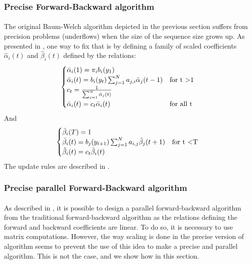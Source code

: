 \subsubsection*{Precise Forward-Backward algorithm}
\paragraph{}
The original Baum-Welch algorithm depicted in the previous section suffers from precision problems (underflows) when the size of the sequence size grows up. As presented in \cite{rabiner1989tutorial}, one way to fix that is by defining a family of scaled coefficients $\hat{\alpha}_i(t)$ and $\hat{\beta}_i(t)$ defined by the relations:
\begin{equation}
\begin{cases}
\bar{\alpha}_i(1) = \pi_i b_i(y_1) & \\
\bar{\alpha}_i(t) = b_i(y_t)\sum_{j=1}^{N}{a_{j,i}\bar{\alpha}_j(t-1)} & \text{for t \textgreater 1} \\
c_t = \frac{1}{\sum^N_{j=1} \bar{\alpha}_j(t)} & \\
\hat{\alpha}_i(t) = c_t \bar{\alpha}_i(t) & \text{for all t}
\end{cases}
\end{equation}
And
\begin{equation}
\begin{cases}
\bar{\beta}_i(T) = 1 & \\
\bar{\beta}_i(t) = b_j(y_{t+1})\sum_{j=1}^{N}{a_{i,j}\hat{\beta}_j(t+1)} & \text{for t \textless T} \\
\hat{\beta}_i(t) = c_t \bar{\beta}_i(t)
\end{cases}
\end{equation}
The update rules are described in \cite{rabiner1989tutorial}.

\subsubsection*{Precise parallel Forward-Backward algorithm}
\paragraph{}
As described in \cite{turin1998unidirectional}, it is possible to design a parallel forward-backward algorithm from the traditional forward-backward algorithm as the relations defining the forward and backward coefficients are linear. To do so, it is necessary to use matrix computations. However, the way scaling is done in the precise version of algorithm seems to prevent the use of this idea to make a precise and parallel algorithm. This is not the case, and we show how in this section.

